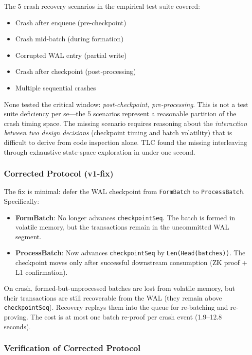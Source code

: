 The 5 crash recovery scenarios in the empirical test suite covered:
\begin{itemize}
\item Crash after enqueue (pre-checkpoint)
\item Crash mid-batch (during formation)
\item Corrupted WAL entry (partial write)
\item Crash after checkpoint (post-processing)
\item Multiple sequential crashes
\end{itemize}

None tested the critical window: \emph{post-checkpoint, pre-processing}.
This is not a test suite deficiency per se---the 5 scenarios represent a
reasonable partition of the crash timing space. The missing scenario requires
reasoning about the \emph{interaction between two design decisions}
(checkpoint timing and batch volatility) that is difficult to derive from
code inspection alone. TLC found the missing interleaving through
exhaustive state-space exploration in under one second.

\subsubsection{Corrected Protocol (v1-fix)}

The fix is minimal: defer the WAL checkpoint from \texttt{FormBatch} to
\texttt{ProcessBatch}. Specifically:

\begin{itemize}
\item \textbf{FormBatch}: No longer advances \texttt{checkpointSeq}. The
  batch is formed in volatile memory, but the transactions remain in the
  uncommitted WAL segment.
\item \textbf{ProcessBatch}: Now advances \texttt{checkpointSeq} by
  \texttt{Len(Head(batches))}. The checkpoint moves only after successful
  downstream consumption (ZK proof + L1 confirmation).
\end{itemize}

On crash, formed-but-unprocessed batches are lost from volatile memory, but
their transactions are still recoverable from the WAL (they remain above
\texttt{checkpointSeq}). Recovery replays them into the queue for
re-batching and re-proving. The cost is at most one batch re-proof per
crash event (1.9--12.8 seconds).

\subsubsection{Verification of Corrected Protocol}

